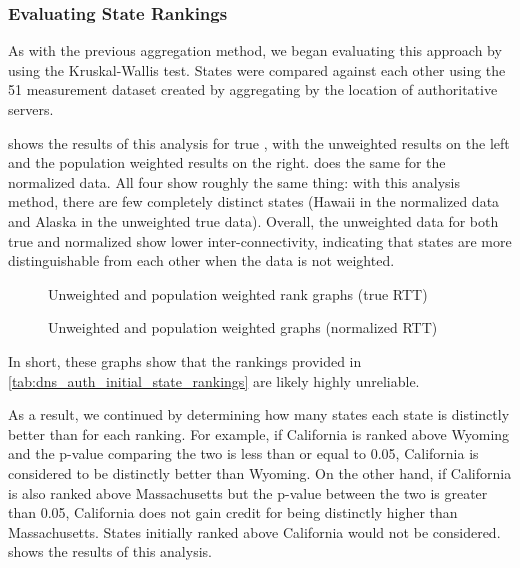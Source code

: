 \subsubsection{Evaluating State Rankings}

As with the previous aggregation method, we began evaluating this approach by using the Kruskal-Wallis test. States were compared against each other using the 51 measurement dataset created by aggregating by the location of authoritative servers.

 shows the results of this analysis for true \rtt, with the unweighted results on the left and the population weighted results on the right.  does the same for the normalized data. All four show roughly the same thing: with this analysis method, there are few completely distinct states (Hawaii in the normalized data and Alaska in the unweighted true \rtt data). Overall, the unweighted data for both true \rtt and normalized \rtt show lower inter-connectivity, indicating that states are more distinguishable from each other when the data is not weighted.

\begin{figure}[htb]
    \centering
    
    
    \caption{Unweighted and population weighted rank graphs (true RTT)}
    \label{fig:dns_auth_agg_s2s_true_rtt_graphs}
\end{figure}

\begin{figure}[h]
    \centering
    
    
    \caption{Unweighted and population weighted graphs (normalized RTT)}
    \label{fig:dns_auth_agg_s2s_norm_rtt_graphs}
\end{figure}

In short, these graphs show that the rankings provided in \cref{tab:dns_auth_initial_state_rankings} are likely highly unreliable.

As a result, we continued by determining how many states each state is distinctly better than for each ranking. For example, if California is ranked above Wyoming and the p-value comparing the two is less than or equal to 0.05, California is considered to be distinctly better than Wyoming. On the other hand, if California is also ranked above Massachusetts but the p-value between the two is greater than 0.05, California does not gain credit for being distinctly higher than Massachusetts. States initially ranked above California would not be considered.  shows the results of this analysis.

